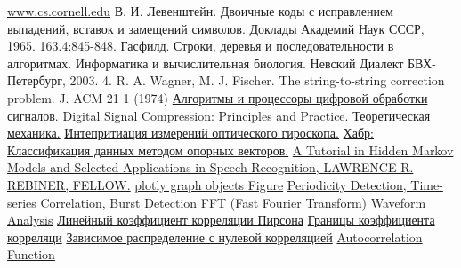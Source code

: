\begin{thebibliography}{}
     \href{http://www.cs.cornell.edu/courses/cs4758/2012sp/materials/hmm_paper_rabiner.pdf}{www.cs.cornell.edu}
     В. И. Левенштейн. Двоичные коды с исправлением выпадений, вставок и
    замещений символов. Доклады Академий Наук СССР, 1965. 163.4:845-848.
     Гасфилд. Строки, деревья и последовательности в алгоритмах. Информатика и
    вычислительная биология. Невский Диалект БВХ-Петербург, 2003.
     4.	R. A. Wagner, M. J. Fischer. The string-to-string correction problem. J. ACM 21 1 (1974)
     \href{https://books.google.ru/books?id=iEO6AgAAQBAJ&pg=PA8&#v=onepage&q&f=false}{Алгоритмы и процессоры цифровой обработки сигналов.}
     \href{https://books.google.ru/books?id=s3H8s8rdsHkC&pg=PA83#v=onepage&q&f=false}{Digital Signal Compression: Principles and Practice.}
     \href{https://web.archive.org/web/20090708124031/http://mexman.ru/?p=6}{Теоретическая механика.}
     \href{http://journals.ioffe.ru/articles/viewPDF/8381}{Интепритиация измерений оптического гироскопа.}
     \href{https://habr.com/ru/post/105220/}{Хабр: Классификация данных методом опорных векторов.}
     \href{http://www.cs.cornell.edu/courses/cs4758/2012sp/materials/hmm_paper_rabiner.pdf}{A Tutorial in Hidden Markov Models and Selected Applications in Speech Recognition, LAWRENCE R. REBINER, FELLOW.}
    \bibitem{} \href{https://plotly.com/python-api-reference/generated/plotly.graph_objects.Figure.html}{plotly graph objects Figure}
    \bibitem{} \href{http://www.l3s.de/~anand/tir14/lectures/ws14-tir-foundations-2.pdf}{Periodicity Detection, Time-series Correlation, Burst Detection}
    \bibitem{} \href{https://www.dataq.com/data-acquisition/general-education-tutorials/fft-fast-fourier-transform-waveform-analysis.html}{FFT (Fast Fourier Transform) Waveform Analysis}
    \bibitem{} \href{https://statanaliz.info/statistica/korrelyaciya-i-regressiya/linejnyj-koefficient-korrelyacii-pirsona/}{Линейный коэффициент корреляции Пирсона}
    \bibitem{} \href{http://risktheory.novosyolov.com/topic_correl.htm}{Границы коэффициента корреляци}
    \bibitem{} \href{http://risktheory.novosyolov.com/ill_zerocorr.htm}{Зависимое распределение с нулевой корреляцией}
    \bibitem{} \href{https://s3.amazonaws.com/assets.datacamp.com/production/course_4267/slides/chapter2.pdf}{Autocorrelation Function}


\end{thebibliography}